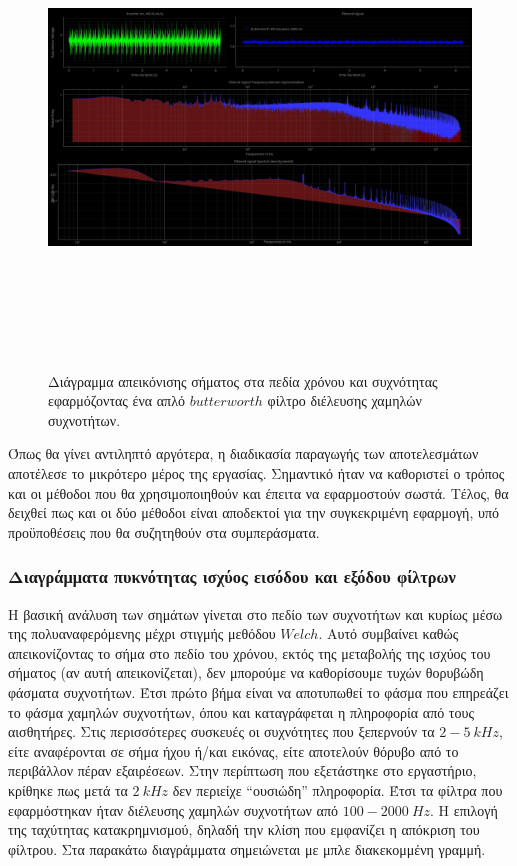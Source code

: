 \documentclass[breaklines=true, 12pt]{article}
\begin{document}
\begin{figure}[htbp]
\centering
\includegraphics[width=450px,height=480px]{./src/sign_overview/butterworth_IIR_low_pass_2000_Hz_Inverter_on_WS_0_.jpg}
\caption{Διάγραμμα απεικόνισης σήματος στα πεδία χρόνου και συχνότητας εφαρμόζοντας ένα απλό \(butterworth\) φίλτρο διέλευσης χαμηλών συχνοτήτων.}
\end{figure}

Όπως θα γίνει αντιληπτό αργότερα, η διαδικασία παραγωγής των αποτελεσμάτων
αποτέλεσε το μικρότερο μέρος της εργασίας. Σημαντικό ήταν να καθοριστεί ο
τρόπος και οι μέθοδοι που θα χρησιμοποιηθούν και έπειτα να εφαρμοστούν
σωστά. Τέλος, θα δειχθεί πως και οι δύο μέθοδοι είναι αποδεκτοί για την
συγκεκριμένη εφαρμογή, υπό προϋποθέσεις που θα συζητηθούν στα συμπεράσματα.

\subsubsection{Διαγράμματα πυκνότητας ισχύος εισόδου και εξόδου φίλτρων}
\label{sec:org3aaeef3}
Η βασική ανάλυση των σημάτων γίνεται στο πεδίο των συχνοτήτων και κυρίως
μέσω της πολυαναφερόμενης μέχρι στιγμής μεθόδου \(Welch\). Αυτό συμβαίνει
καθώς απεικονίζοντας το σήμα στο πεδίο του χρόνου, εκτός της μεταβολής της
ισχύος του σήματος (αν αυτή απεικονίζεται), δεν μπορούμε να καθορίσουμε
τυχών θορυβώδη φάσματα συχνοτήτων. Έτσι πρώτο βήμα είναι να αποτυπωθεί το
φάσμα που επηρεάζει το φάσμα χαμηλών συχνοτήτων, όπου και καταγράφεται η
πληροφορία από τους αισθητήρες. Στις περισσότερες συσκευές οι συχνότητες
που ξεπερνούν τα \(2-5\ kHz\), είτε αναφέρονται σε σήμα ήχου ή/και εικόνας,
είτε αποτελούν θόρυβο από το περιβάλλον πέραν εξαιρέσεων. Στην περίπτωση
που εξετάστηκε στο εργαστήριο, κρίθηκε πως μετά τα \(2\ kHz\) δεν περιείχε
“ουσιώδη” πληροφορία. Έτσι τα φίλτρα που εφαρμόστηκαν ήταν διέλευσης χαμηλών
συχνοτήτων από \(100-2000\ Hz\). Η επιλογή της ταχύτητας κατακρημνισμού,
δηλαδή την κλίση που εμφανίζει η απόκριση του φίλτρου. Στα παρακάτω
διαγράμματα σημειώνεται με μπλε διακεκομμένη γραμμή.
\end{document}
